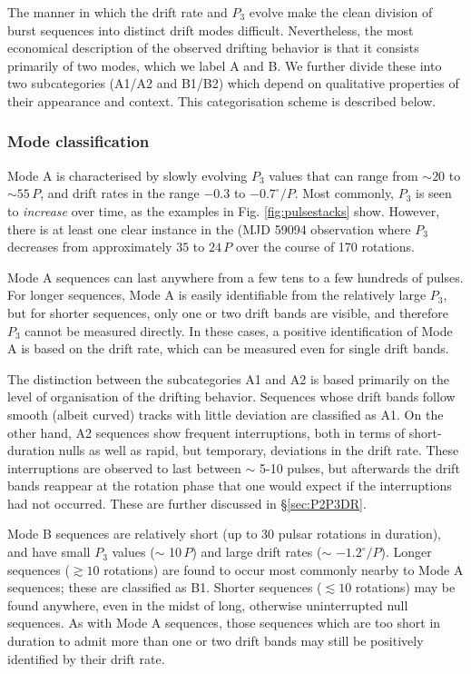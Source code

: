 \documentclass[linenumbers]{aastex631}
\begin{document}
The manner in which the drift rate and $P_3$ evolve make the clean division of burst sequences into distinct drift modes difficult.
Nevertheless, the most economical description of the observed drifting behavior is that it consists primarily of two modes, which we label A and B.
We further divide these into two subcategories (A1/A2 and B1/B2) which depend on qualitative properties of their appearance and context.
This categorisation scheme is described below.

\subsubsection{Mode classification}

Mode A is characterised by slowly evolving $P_3$ values that can range from $\sim20$ to $\sim55\,P$, and drift rates in the range $-0.3$ to $-0.7^\circ/P$.
Most commonly, $P_3$ is seen to \textit{increase} over time, as the examples in Fig. \ref{fig:pulsestacks} show.
However, there is at least one clear instance in the (MJD 59094 observation where $P_3$ decreases from approximately $35$ to $24\,P$ over the course of 170 rotations.

Mode A sequences can last anywhere from a few tens to a few hundreds of pulses.
For longer sequences, Mode A is easily identifiable from the relatively large $P_3$, but for shorter sequences, only one or two drift bands are visible, and therefore $P_3$ cannot be measured directly.
In these cases, a positive identification of Mode A is based on the drift rate, which can be measured even for single drift bands.

The distinction between the subcategories A1 and A2 is based primarily on the level of organisation of the drifting behavior.
Sequences whose drift bands follow smooth (albeit curved) tracks with little deviation are classified as A1.
On the other hand, A2 sequences show frequent interruptions, both in terms of short-duration nulls as well as rapid, but temporary, deviations in the drift rate.
These interruptions are observed to last between $\sim$ 5-10 pulses, but afterwards the drift bands reappear at the rotation phase that one would expect if the interruptions had not occurred.
These are further discussed in \S\ref{sec:P2P3DR}.

Mode B sequences are relatively short (up to 30 pulsar rotations in duration), and have small $P_3$ values ($\sim$ 10\,$P$) and large drift rates ($\sim$ $-1.2^\circ/P$).
Longer sequences ($\gtrsim 10$ rotations) are found to occur most commonly nearby to Mode A sequences; these are classified as B1.
Shorter sequences ($\lesssim 10$ rotations) may be found anywhere, even in the midst of long, otherwise uninterrupted null sequences.
As with Mode A sequences, those sequences which are too short in duration to admit more than one or two drift bands may still be positively identified by their drift rate.
\end{document}
